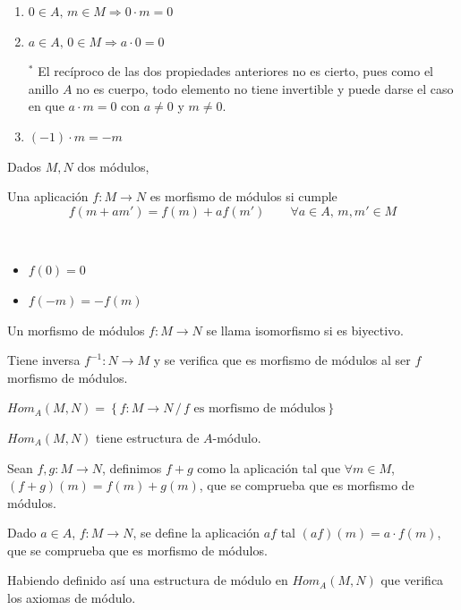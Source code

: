 \begin{propis} \:  \vspace{-3mm}
    \begin{enumerate}
        \item $0\in A, \, m\in M \Rightarrow 0 \cdot m = 0$
        \item $a\in A, \, 0\in M \Rightarrow a \cdot 0 = 0$

        $^*$ El rec\'iproco de las dos propiedades anteriores no es cierto, pues como el anillo $A$ no es cuerpo, todo elemento no tiene invertible y puede darse el caso en que $a\cdot m=0$ con $a\neq 0$ y $m\neq 0$.
        \item $(-1) \cdot m = -m $
    \end{enumerate}
\end{propis}

Dados $M,N$ dos m\'odulos, 
\begin{defi}
    Una aplicaci\'on $f: M\longrightarrow N$ es morfismo de m\'odulos si cumple
    $$f(m+am') = f(m)+a f(m') \qquad \forall a\in A, \, m,m'\in M$$
\end{defi}
\begin{propis}\, \vspace{-3mm}
    \begin{itemize} 
        \item $f(0)=0$
        \item $f(-m)=-f(m)$
    \end{itemize}
\end{propis}
\begin{defi}
    Un morfismo de m\'odulos $f: M\longrightarrow N$ se llama isomorfismo si es biyectivo.
\end{defi}
\begin{obs}
    Tiene inversa $f^{-1} : N \longrightarrow M$ y se verifica que es morfismo de m\'odulos al ser $f$ morfismo de m\'odulos.
\end{obs}
\begin{defi}
    $Hom_A(M,N) = \left\{ f: M \longrightarrow N \, / \, f \text{ es morfismo de m\'odulos} \right\}$
\end{defi}
\begin{prop}
    $Hom_A(M,N)$ tiene estructura de $A$-m\'odulo.
\end{prop}
\begin{dem}
    Sean $f,g: M \longrightarrow N$, definimos $f+g$ como la aplicaci\'on tal que $\forall m \in M$, $(f+g)(m) = f(m) + g(m)$, que se comprueba que es morfismo de m\'odulos. 

    Dado $a\in A$, $f:M \longrightarrow N$, se define la aplicaci\'on $af$ tal $(af)(m) = a\cdot f(m)$, que se comprueba que es morfismo de m\'odulos. 

    Habiendo definido as\'i una estructura de m\'odulo en $Hom_A (M,N)$ que verifica los axiomas de m\'odulo.
\end{dem}
